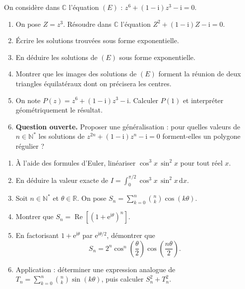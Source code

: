 \documentclass[11pt]{article}
\begin{document}
\begin{exercice}
On considère dans $\mathbb{C}$ l'équation $(E)$ : $z^6+(1-\mathrm{i})z^3-\mathrm{i}=0$.
\begin{enumerate}
\item On pose $Z=z^3$. Résoudre dans $\mathbb{C}$ l'équation $Z^2+(1-\mathrm{i})Z-\mathrm{i}=0$.
\item Écrire les solutions trouvées sous forme exponentielle.
\item En déduire les solutions de $(E)$ sous forme exponentielle.
\item Montrer que les images des solutions de $(E)$ forment la réunion de deux triangles équilatéraux dont on précisera les centres.
\item On note $P(z)=z^6+(1-\mathrm{i})z^3-\mathrm{i}$. Calculer $P(1)$ et interpréter géométriquement le résultat.
\item \textbf{Question ouverte.} Proposer une généralisation : pour quelles valeurs de $n\in\mathbb{N}^*$ les solutions de $z^{2n}+(1-\mathrm{i})z^n-\mathrm{i}=0$ forment-elles un polygone régulier ?
\end{enumerate}
\end{exercice}

\begin{exercice}
\begin{enumerate}
\item À l'aide des formules d'Euler, linéariser $\cos^3 x\,\sin^2 x$ pour tout réel $x$.
\item En déduire la valeur exacte de $\displaystyle I=\int_0^{\pi/2}\cos^3 x\,\sin^2 x\,\mathrm{d}x$.
\item Soit $n\in\mathbb{N}^*$ et $\theta\in\mathbb{R}$. On pose $S_n=\displaystyle\sum_{k=0}^{n}\binom{n}{k}\cos(k\theta)$.
\item Montrer que $S_n=\operatorname{Re}\!\left[\left(1+\mathrm{e}^{\mathrm{i}\theta}\right)^n\right]$.
\item En factorisant $1+\mathrm{e}^{\mathrm{i}\theta}$ par $\mathrm{e}^{\mathrm{i}\theta/2}$, démontrer que
\[S_n=2^n\cos^n\!\left(\dfrac{\theta}{2}\right)\cos\!\left(\dfrac{n\theta}{2}\right).\]
\item Application : déterminer une expression analogue de $T_n=\displaystyle\sum_{k=0}^{n}\binom{n}{k}\sin(k\theta)$, puis calculer $S_n^2+T_n^2$.
\end{enumerate}
\end{exercice}
\end{document}
